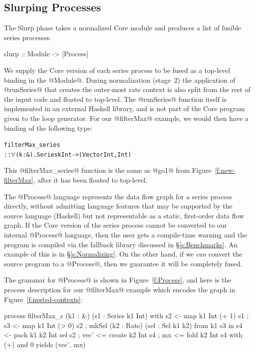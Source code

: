 \subsection{Slurping Processes}
\label{s:Slurping}
The Slurp phase takes a normalized Core module and produces a list of fusible series processes.
\begin{code}
    slurp  :: Module -> [Process]
\end{code}

We supply the Core version of each series process to be fused as a top-level binding in the @Module@. During normalization (stage~2) the application of @runSeries@ that creates the outer-most rate context is also split from the rest of the input code and floated to top-level. The @runSeries@ function itself is implemented in an external Haskell library, and is not part of the Core program given to the loop generator. For our @filterMax@ example, we would then have a binding of the following type:

%
\begin{alltt}
  filterMax_series 
   :: \(\forall\)(k : &). Series k Int -> (Vector Int, Int)
\end{alltt}

This @filterMax_series@ function is the same as @go1@ from Figure~\ref{f:new-filterMax}, after it has been floated to top-level.

The @Process@ language represents the data flow graph for a series process directly, without admitting language features that may be supported by the source language (Haskell) but not representable as a static, first-order data flow graph. If the Core version of the series process cannot be converted to our internal @Process@ language, then the user gets a compile-time warning and the program is compiled via the fallback library discussed in \S\ref{s:Benchmarks}. An example of this is in \S\ref{s:Normalizing}. On the other hand, if we \emph{can} convert the source program to a @Process@, then we guarantee it will be completely fused.


\eject
The grammar for @Process@ is shown in Figure~\ref{f:Process}, and here is the process description for our @filterMax@ example which encodes the graph in Figure~\ref{f:nested-contexts}:

\begin{code}
process filterMax_s (k1 : &) (s1 : Series k1 Int)
 with { s2 <- map k1 Int (+ 1) s1
      ; s3 <- map k1 Int (> 0) s2
      ; mkSel (k2 : Rate) (sel : Sel k1 k2)
          from  k1 s3  in
        { s4   <- pack   k1 k2 Int sel s2
        ; vec' <= create k2 Int s4
        ; mx   <= fold k2 Int s4 with (+) and 0 } }
 yields (vec', mx)
\end{code}


